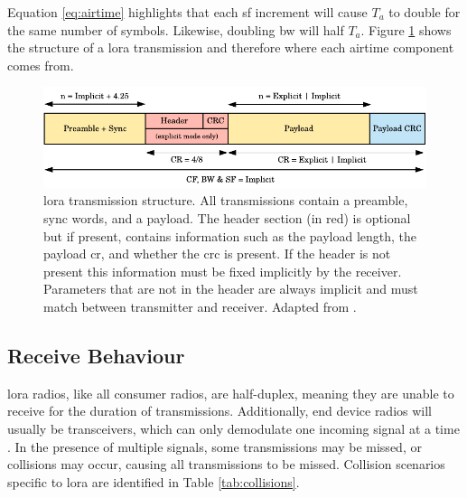 Equation \ref{eq:airtime} highlights that each \ac{sf} increment will cause $T_a$ to double for the same  number of symbols. Likewise, doubling \ac{bw} will half $T_a$. Figure \ref{lora_transmission_structure} shows the structure of a \ac{lora} transmission and therefore where each airtime component comes from. 
\vspace{5mm}
\begin{figure}[H]
    \centering
   	\includegraphics{Figures/lora_transmission}
    \caption[\ac{lora} transmission packet structure]{
   \ac{lora} transmission structure. All transmissions contain a preamble, sync words, and a payload. The header section (in red) is optional but if present, contains information such as the payload length, the payload \ac{cr}, and whether the \ac{crc} is present. If the header is not present this information must be fixed implicitly by the receiver. Parameters that are not in the header are always implicit and must match between transmitter and receiver. Adapted from \cite{3YP:LORA_SX12}.
    }
    \label{lora_transmission_structure}
\end{figure}


\subsection{Receive Behaviour}
\label{sec:lora_considerations}
\ac{lora} radios, like all consumer radios, are half-duplex, meaning they are unable to receive for the duration of transmissions. Additionally, end device radios will usually be transceivers, which can only demodulate one incoming signal at a time \cite{3YP:LORA_SX12}. In the presence of multiple signals, some transmissions may be missed, or collisions may occur, causing all transmissions to be missed. Collision scenarios specific to \ac{lora} are identified in Table \ref{tab:collisions}. 

